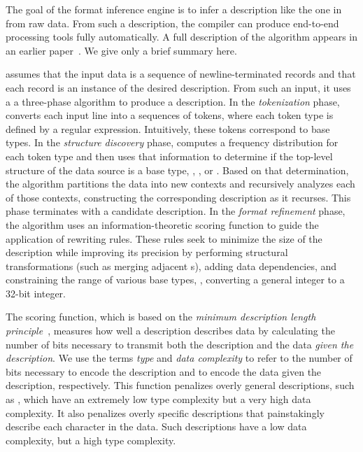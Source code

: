 The goal of the \learnpads{} format inference engine is to infer a
\pads{} description like the one in  from raw data.
From such a description, the \pads{} compiler can produce end-to-end
processing tools fully automatically.  A full description of the
\learnpads{} algorithm appears in an earlier
paper~\cite{Fisher+:dirttoshovels}.  We give only a brief summary
here.  

\learnpads{} assumes that the input data is a sequence of
newline-terminated records and that each record is an instance of the
desired description.  From such an input, it uses a a three-phase
algorithm to produce a description.  In the {\em tokenization} phase,
\learnpads{} converts each input line into a sequences of tokens,
where each token type is defined by a regular expression.
Intuitively, these tokens correspond to \pads{} base types.
%
%
In the {\em structure discovery} phase, \learnpads{} computes a
frequency distribution for each token type and then uses that
information to determine if the top-level structure of the data source
is a base type, , , or .  Based on
that determination, the algorithm partitions the data into new
contexts and recursively analyzes each of those contexts, constructing
the corresponding description as it recurses.  This phase terminates
with a candidate description.  In the {\em format refinement} phase,
the algorithm uses an information-theoretic scoring function to guide the
application of rewriting rules.
These rules seek to minimize the size of the description while
improving its precision by performing structural transformations (such
as merging adjacent s),  adding data dependencies, and
constraining the range of various base types, \eg{}, converting a
general integer to a 32-bit integer.  

The scoring function, which is based on the \textit{minimum
  description length principle}~\cite{mdlbook}, 
measures how well a description describes data by calculating
the number of bits necessary to transmit both the description and the
data \textit{given the description}.  We use the terms \textit{type}
  and \textit{data complexity} to refer to the number of bits necessary to
encode the description and to encode the data given the description,
respectively.  This function penalizes overly
general descriptions, such as , which have an extremely
low type complexity but a very high data complexity.  It also
penalizes overly specific descriptions that painstakingly describe
each character in the data.  Such descriptions have a low data
complexity, but a high type complexity.


